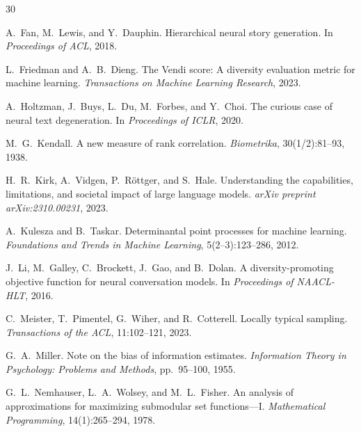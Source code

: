\documentclass[11pt,a4paper]{article}
\begin{document}

\begin{thebibliography}{30}

A.~Fan, M.~Lewis, and Y.~Dauphin.
\newblock Hierarchical neural story generation.
\newblock In \emph{Proceedings of ACL}, 2018.

L.~Friedman and A.~B.~Dieng.
\newblock The {V}endi score: A diversity evaluation metric for
  machine learning.
\newblock \emph{Transactions on Machine Learning Research}, 2023.

A.~Holtzman, J.~Buys, L.~Du, M.~Forbes, and Y.~Choi.
\newblock The curious case of neural text degeneration.
\newblock In \emph{Proceedings of ICLR}, 2020.

M.~G.~Kendall.
\newblock A new measure of rank correlation.
\newblock \emph{Biometrika}, 30(1/2):81--93, 1938.

H.~R.~Kirk, A.~Vidgen, P.~R{\"o}ttger, and S.~Hale.
\newblock Understanding the capabilities, limitations, and societal
  impact of large language models.
\newblock \emph{arXiv preprint arXiv:2310.00231}, 2023.

A.~Kulesza and B.~Taskar.
\newblock Determinantal point processes for machine learning.
\newblock \emph{Foundations and Trends in Machine Learning},
  5(2--3):123--286, 2012.

J.~Li, M.~Galley, C.~Brockett, J.~Gao, and B.~Dolan.
\newblock A diversity-promoting objective function for neural
  conversation models.
\newblock In \emph{Proceedings of NAACL-HLT}, 2016.

C.~Meister, T.~Pimentel, G.~Wiher, and R.~Cotterell.
\newblock Locally typical sampling.
\newblock \emph{Transactions of the ACL}, 11:102--121, 2023.

G.~A.~Miller.
\newblock Note on the bias of information estimates.
\newblock \emph{Information Theory in Psychology: Problems and
  Methods}, pp.~95--100, 1955.

G.~L.~Nemhauser, L.~A.~Wolsey, and M.~L.~Fisher.
\newblock An analysis of approximations for maximizing submodular
  set functions---{I}.
\newblock \emph{Mathematical Programming}, 14(1):265--294, 1978.


\end{thebibliography}
\end{document}
